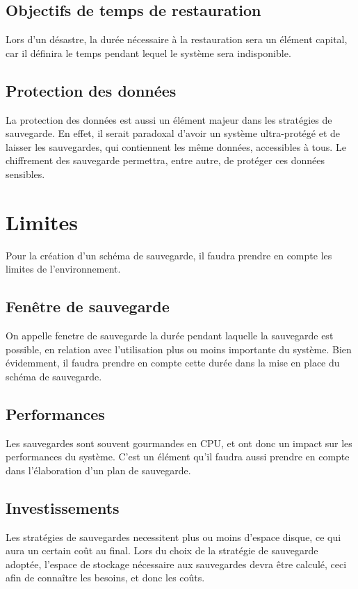 \documentclass[a4paper,11pt]{report}
\begin{document}
\subsection{Objectifs de temps de restauration}
Lors d'un désastre, la durée nécessaire à la restauration sera un élément capital, car il définira le temps pendant lequel le système sera indisponible.

\subsection{Protection des données}
La protection des données est aussi un élément majeur dans les stratégies de sauvegarde.
En effet, il serait paradoxal d'avoir un système ultra-protégé et de laisser les sauvegardes, qui contiennent les même données, accessibles à tous.
Le chiffrement des sauvegarde permettra, entre autre, de protéger ces données sensibles.

\section{Limites}
Pour la création d'un schéma de sauvegarde, il faudra prendre en compte les limites de l'environnement.

\subsection{Fenêtre de sauvegarde}
On appelle fenetre de sauvegarde la durée pendant laquelle la sauvegarde est possible, en relation avec l'utilisation plus ou moins importante du système.
Bien évidemment, il faudra prendre en compte cette durée dans la mise en place du schéma de sauvegarde.

\subsection{Performances}
Les sauvegardes sont souvent gourmandes en CPU, et ont donc un impact sur les performances du système.
C'est un élément qu'il faudra aussi prendre en compte dans l'élaboration d'un plan de sauvegarde.

\subsection{Investissements}
Les stratégies de sauvegardes necessitent plus ou moins d'espace disque, ce qui aura un certain coût au final.
Lors du choix de la stratégie de sauvegarde adoptée, l'espace de stockage nécessaire aux sauvegardes devra être calculé, ceci afin de connaître les besoins, et donc les coûts.
\end{document}

